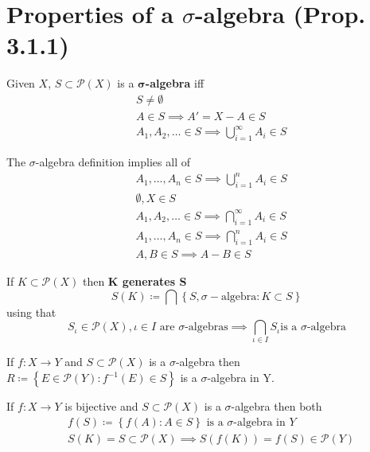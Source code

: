 \documentclass[letterpaper,11pt,intlimits,sumlimits]{amsart}
\newcommand{\powerset}[1]{\mathcal{P}\left({#1}\right)}
\newcommand{\keyphrase}[1]{\textbf{#1}}
\begin{document}
\section*{Properties of a $\sigma$-algebra (Prop. 3.1.1)}

Given $X$, $S\subset\powerset{X}$ is a
\keyphrase{$\boldsymbol{\sigma}$-algebra} iff
\begin{align*}
    &S \neq \emptyset \tag{i} \\
    &A \in S \implies A' = X - A \in S \tag{ii} \\
    &A_{1}, A_{2},\ldots \in S \implies
    \bigcup_{i=1}^{\infty} A_{i} \in S \tag{iii}
\end{align*}

The $\sigma$-algebra definition implies all of
\begin{align*}
    &A_{1}, \ldots,A_{n} \in S \implies
        \bigcup_{i=1}^{n} A_{i} \in S
    \tag{3.1.1 i} \\
    &\emptyset, X \in S
    \tag{3.1.1 ii} \\
    &A_{1}, A_{2},\ldots \in S \implies
        \bigcap_{i=1}^{\infty} A_{i} \in S
    \tag{3.1.1 iii} \\
    &A_{1},\ldots,A_{n} \in S \implies
        \bigcap_{i=1}^{n} A_{i} \in S
    \tag{3.1.1 iv} \\
    &A,B \in S \implies A-B \in S
    \tag{3.1.1 v}
\end{align*}

If $K\subset\powerset{X}$ then \keyphrase{K generates S}
\[
    S\!\left( K \right) \coloneqq
    \bigcap \left\{ S, \sigma-\text{algebra} : K\subset{}S \right\}
\]
using that
\[
    S_{\iota} \in \powerset{X}, \iota \in I
    \text{ are $\sigma$-algebras}
    \implies
    \bigcap_{\iota\in{}I} S_{\iota}
    \text{is a $\sigma$-algebra}
\]

If $f:X \to Y$ and $S\subset\powerset{X}$ is a $\sigma$-algebra
then
    $R \coloneqq \left\{
        E\in\powerset{Y} : f^{-1}\left( E \right) \in S
    \right\}$
is a $\sigma$-algebra in Y.

If $f:X \to Y$ is bijective
and $S\subset\powerset{X}$ is a $\sigma$-algebra
then both
\begin{align*}
    &f\left( S \right) \coloneqq \left\{ f(A) : A \in S \right\}
    \text{ is a $\sigma$-algebra in $Y$ }
    \tag{a} \\
    &S\!\left( K \right) = S\subset\powerset{X}
        \implies S\!\left( f\left(K\right) \right)
        = f\left(S\right)\in\powerset{Y}
    \tag{b}
\end{align*}
\end{document}
